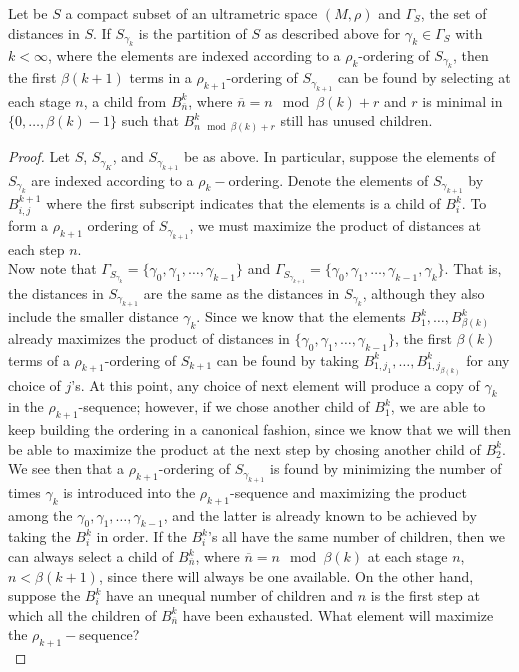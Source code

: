 \begin{proposition*} 
Let be $S$ a compact subset of an ultrametric space $(M, \rho)$ and $\Gamma_S$, the set of distances in $S$. If $S_{\gamma_k}$ is the partition of $S$ as described above for $\gamma_k \in \Gamma_S$ with $k < \infty$, where the elements are indexed according to a $\rho_k$-ordering of $S_{\gamma_k}$, then the first $\beta(k+1)$ terms in a $\rho_{k+1}$-ordering of $S_{\gamma_{k+1}}$ can be found by selecting at each stage $n$, a child from $B^k_{\overline{n}}$, where $\overline{n} = n \mod \beta(k) +r $ and $r$ is minimal in $\{0,\ldots,\beta(k)-1\}$ such that $B^k_{n \mod \beta(k) +r}$ still has unused children.
\end{proposition*}

\begin{proof}
Let $S$, $S_{\gamma_K}$, and $S_{\gamma_{k+1}}$ be as above. In particular, suppose the elements of $S_{\gamma_k}$ are indexed according to a $\rho_k-$ordering. Denote the elements of $S_{\gamma_{k+1}}$ by $B^{k+1}_{i,j}$ where the first subscript indicates that the elements is a child of $B^k_i$. To form a $\rho_{k+1}$ ordering of $S_{\gamma_{k+1}}$, we must maximize the product of distances at each step $n$.\\

Now note that $\Gamma_{S_{\gamma_k}} = \{\gamma_0, \gamma_1,\ldots, \gamma_{k-1}\}$ and $\Gamma_{S_{\gamma_{k+1}}} = \{\gamma_0, \gamma_1,\ldots, \gamma_{k-1}, \gamma_{k}\}$. That is, the distances in $S_{\gamma_{k+1}}$ are the same as the distances in $S_{\gamma_k}$, although they also include the smaller distance $\gamma_k$. Since we know that the elements $B^k_1,\ldots,B^k_{\beta(k)}$ already maximizes the product of distances in $\{\gamma_0, \gamma_1,\ldots, \gamma_{k-1}\}$, the first $\beta(k)$ terms of a $\rho_{k+1}$-ordering of $S_{k+1}$ can be found by taking $B^k_{1,j_1},\ldots, B^k_{1,j_{\beta(k)}}$ for any choice of $j$'s. At this point, any choice of next element will produce a copy of $\gamma_k$ in the $\rho_{k+1}$-sequence; however, if we chose another child of $B^k_{1}$, we are able to keep building the ordering in a canonical fashion, since we know that we will then be able to maximize the product at the next step by chosing another child of $B^k_{2}$.\\

We see then that a $\rho_{k+1}$-ordering of $S_{\gamma_{k+1}}$ is found by minimizing the number of times $\gamma_k$ is introduced into the $\rho_{k+1}$-sequence and maximizing the product among the $\gamma_0, \gamma_1,\ldots, \gamma_{k-1}$, and the latter is already known to be achieved by taking the $B^k_i$ in order.  If the $B^k_i$'s all have the same number of children, then we can always select a child of $B^k_{\overline{n}}$, where $\overline{n} = n \mod \beta(k)$ at each stage $n$, $n < \beta(k+1)$, since there will always be one available. On the other hand, suppose the $B^k_i$ have an unequal number of children and $n$ is the first step at which all the children of $B^k_{\overline{n}}$ have been exhausted. What element will maximize the $\rho_{k+1}-$sequence?\\


\end{proof}
